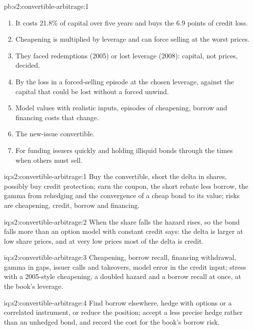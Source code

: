 \begin{solution}{pb:s2:convertible-arbitrage:1}
\begin{enumerate}
\item It costs 21.8\% of capital over five years and buys the 6.9 points of credit loss.
\item Cheapening is multiplied by leverage and can force selling at the worst prices.
\item They faced redemptions (2005) or lost leverage (2008): capital, not prices, decided.
\item By the loss in a forced-selling episode at the chosen leverage, against the capital that could be lost without a forced unwind.
\item Model values with realistic inputs, episodes of cheapening, borrow and financing costs that change.
\item The new-issue convertible.
\item For funding issuers quickly and holding illiquid bonds through the times when others must sell.
\end{enumerate}
\end{solution}

\begin{solution}{iq:s2:convertible-arbitrage:1}
Buy the convertible, short the delta in shares, possibly buy credit protection; earn the coupon, the short rebate less borrow, the gamma from
rehedging and the convergence of a cheap bond to its value; risks are cheapening, credit, borrow and financing.
\end{solution}

\begin{solution}{iq:s2:convertible-arbitrage:2}
When the share falls the hazard rises, so the bond falls more than an option model with constant credit says: the delta is larger at low share
prices, and at very low prices most of the delta is credit.
\end{solution}

\begin{solution}{iq:s2:convertible-arbitrage:3}
Cheapening, borrow recall, financing withdrawal, gamma in gaps, issuer calls and takeovers, model error in the credit input; stress with a 2005-style
cheapening, a doubled hazard and a borrow recall at once, at the book's leverage.
\end{solution}

\begin{solution}{iq:s2:convertible-arbitrage:4}
Find borrow elsewhere, hedge with options or a correlated instrument, or reduce the position; accept a less precise hedge rather than an unhedged
bond, and record the cost for the book's borrow risk.
\end{solution}

